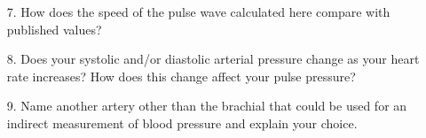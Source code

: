 \documentclass{article}
\begin{document}
\begin{itemize}
	\item[7.] How does the speed of the pulse wave calculated here compare with published values?\vspace{3cm}
	\item[8.] Does your systolic and/or diastolic arterial pressure change as your heart rate increases? How does this change affect your pulse pressure?\vspace{4cm}
	\item[9.] Name another artery other than the brachial that could be used for an indirect measurement of blood pressure and explain your choice.
\end{itemize}
\end{document}
